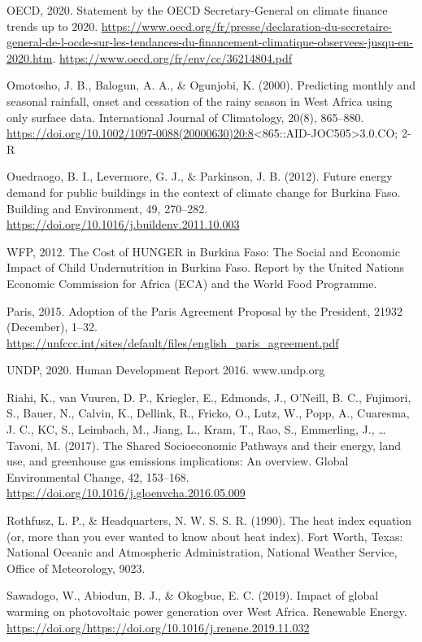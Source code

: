\documentclass[
]{book}
\begin{document}
OECD, 2020. Statement by the OECD Secretary-General on climate finance trends up to 2020. \url{https://www.oecd.org/fr/presse/declaration-du-secretaire-general-de-l-ocde-sur-les-tendances-du-financement-climatique-observees-jusqu-en-2020.htm}. \url{https://www.oecd.org/fr/env/cc/36214804.pdf}

Omotosho, J. B., Balogun, A. A., \& Ogunjobi, K. (2000). Predicting monthly and seasonal rainfall, onset and cessation of the rainy season in West Africa using only surface data. International Journal of Climatology, 20(8), 865--880. \url{https://doi.org/10.1002/1097-0088(20000630)20:8}\textless865::AID-JOC505\textgreater3.0.CO; 2-R

Ouedraogo, B. I., Levermore, G. J., \& Parkinson, J. B. (2012). Future energy demand for public buildings in the context of climate change for Burkina Faso. Building and Environment, 49, 270--282. \url{https://doi.org/10.1016/j.buildenv.2011.10.003}

WFP, 2012. The Cost of HUNGER in Burkina Faso: The Social and Economic Impact of Child Undernutrition in Burkina Faso. Report by the United Nations Economic Commission for Africa (ECA) and the World Food Programme.

Paris, 2015. Adoption of the Paris Agreement Proposal by the President, 21932 (December), 1--32. \url{https://unfccc.int/sites/default/files/english_paris_agreement.pdf}

UNDP, 2020. Human Development Report 2016. www.undp.org

Riahi, K., van Vuuren, D. P., Kriegler, E., Edmonds, J., O'Neill, B. C., Fujimori, S., Bauer, N., Calvin, K., Dellink, R., Fricko, O., Lutz, W., Popp, A., Cuaresma, J. C., KC, S., Leimbach, M., Jiang, L., Kram, T., Rao, S., Emmerling, J., \ldots{} Tavoni, M. (2017). The Shared Socioeconomic Pathways and their energy, land use, and greenhouse gas emissions implications: An overview. Global Environmental Change, 42, 153--168. \url{https://doi.org/10.1016/j.gloenvcha.2016.05.009}

Rothfusz, L. P., \& Headquarters, N. W. S. S. R. (1990). The heat index equation (or, more than you ever wanted to know about heat index). Fort Worth, Texas: National Oceanic and Atmospheric Administration, National Weather Service, Office of Meteorology, 9023.

Sawadogo, W., Abiodun, B. J., \& Okogbue, E. C. (2019). Impact of global warming on photovoltaic power generation over West Africa. Renewable Energy. \url{https://doi.org/https://doi.org/10.1016/j.renene.2019.11.032}
\end{document}
